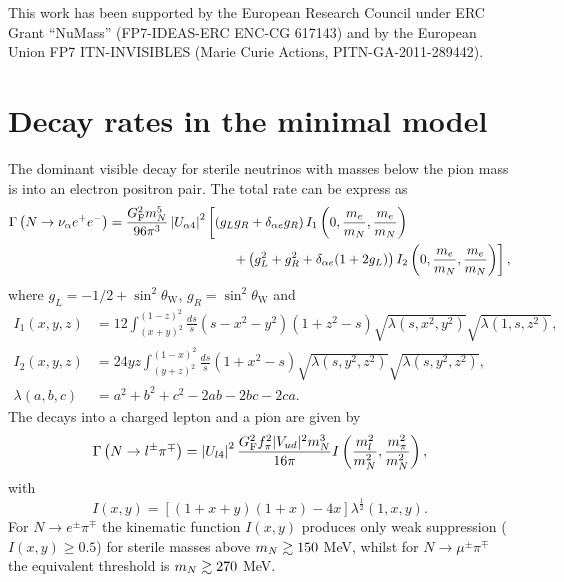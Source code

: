 \documentclass[11pt, a4paper]{article}
\def\ster{\ensuremath N}
\begin{document}
This work has been supported by the European Research Council under ERC Grant
“NuMass” (FP7-IDEAS-ERC ENC-CG 617143) and by the European Union FP7
ITN-INVISIBLES (Marie Curie Actions, PITN-GA-2011-289442).

\appendix

\section{\label{app:decayrates}Decay rates in the minimal model}

The dominant visible decay for sterile neutrinos with masses below the pion
mass is into an electron positron pair. The total rate can be express as
%
\begin{align*} \Gamma\left(\ster\to \nu_\alpha e^+e^-\right) =
\frac{G_\text{F}^2m_\ster^5}{96\pi^3}\left|U_{\alpha 4}\right|^2&\left[\left( g_Lg_R + \delta_{\alpha e}g_R\right)I_1\left(0,\frac{m_e}{m_\ster}, \frac{
m_e}{m_\ster}\right)\right.\\ 
&\left.\qquad + \left(g_L^2 + g_R^2 + \delta_{\alpha e}(1+2g_L)\right)I_2\left(0,\frac{m_e}{m_\ster},\frac{m_e}{m_\ster}\right)\right],  \end{align*}
%
where $g_L = -1/2 + \sin^2\theta_\text{W}$, $g_R = \sin^2\theta_\text{W}$ and
% 
\begin{align*} I_1(x,y,z) & =12 \int_{(x+y)^2}^{(1-z)^2}
\frac{ds}{s}(s-x^2-y^2)(1+z^2-s)\sqrt{\lambda(s,x^2,y^2)}\sqrt{\lambda(1,s,z^2)},\\
I_2(x,y,z)& =24yz\int_{(y+z)^2}^{(1-x)^2}\frac{ds}{s}\left(1+x^2-s\right)\sqrt{\lambda\left(s,y^2,z^2\right)}\sqrt{\lambda\left(s,y^2,z^2\right)},\\
\lambda(a,b,c) &= a^2+b^2+c^2 - 2ab-2bc-2ca.  \end{align*}
%
The decays into a charged lepton and a pion are given by 
%
\[ \Gamma\left(\ster\to l^\pm\pi^\mp\right) =
\left|U_{l4}\right|^2\frac{G_\text{F}^2f_\pi^2 |V_{ud}|^2
m_\ster^3}{16\pi}I\left(\frac{m_l^2}{m_\ster^2} ,
\frac{m_\pi^2}{m_\ster^2}\right) , \] 
%
with \[ I(x,y) = \left[ \left( 1+x+y\right) \left(1+x\right) -4 x\right]
\lambda^\frac{1}{2}\left(1,x,y\right).  \]
%
For $N\to e^\pm\pi^\mp$ the kinematic function $I(x,y)$ produces only weak suppression ($I(x,y)\geq 0.5$) for sterile masses above $m_\ster\gtrsim 150$ MeV, whilst for $N\to
\mu^\pm\pi^\mp$ the equivalent threshold is $m_\ster\gtrsim 270$ MeV.
\end{document}
